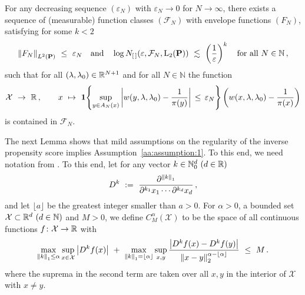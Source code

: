 \begin{assumption}
  \label{aa:assumption:1}
  For any decreasing sequence
  $(\varepsilon_N)$ with $\varepsilon_N\to 0$ for $N\to\infty$,
there exists a sequence of (measurable) function classes
$(\mathcal{F}_N)$
with envelope functions
$(F_N)$,
satisfying 
for some $k<2$
\begin{gather*}
\norm{F_N}_{L^2(\P)}
\ 
\le
\ 
\varepsilon_N
\quad
\text{and}
\quad
  \log
  N_{[\,]}(\varepsilon,\mathcal{F}_N,\mathrm{L}_2(\P))
  \ 
  \lesssim
  \ 
  \left( 
  \frac{1}{\varepsilon}
  \right)^k
  \quad
  \text{for all}
  \ 
  N\in\mathbb{N}
  \,,
\end{gather*}
such that for all $(\lambda,\lambda_0)\in\mathbb{R}^{N+1}$ and for all $N\in\mathbb{N}$ the function
\begin{gather}
  \label{ghost_function}
  \mathcal{X}
  \ 
  \to
  \ 
  \R
  \,,
  \qquad
  x
  \ 
  \mapsto
  \ 
  \mathbf{1}{
    \left\{ 
      \sup_{y\in A_N(x)}
      \left| 
      w(y,\lambda,\lambda_0)
      -
      \frac{1}{\pi(y)}
      \right|
      \,
      \le
      \,
      \varepsilon_N
    \right\}
  }
  \left( 
      w(x,\lambda,\lambda_0)
      -
      \frac{1}{\pi(x)}
  \right)
\end{gather}
is contained in $\mathcal{F}_N$.
\end{assumption}
The next Lemma shows that mild assumptions on the regularity of the inverse propensity score implies Assumption~\ref{aa:assumption:1}.
To this end, we need notation from \cite[§2.7.1]{vaart2013}.
To this end, let for any vector $k\in\mathbb{N}_0^d \ (d\in\mathbb{R})$
\begin{gather*}
  D^k
  \ :=\ 
  \frac
  {\partial^{\norm{k}_1}}
  {
    \partial^{k_1}x_1
    \cdots
    \partial^{k_d}x_d
  }
  \,,
\end{gather*}
and let $\lfloor a \rfloor$ be the greatest integer smaller than $a>0$.
For $\alpha>0$, a bounded set 
$\mathcal{X}\subset\R^d\ (d\in\mathbb{N})$
and
$M>0$, we define $C^\alpha_M(\mathcal{X})$ to be the space of all continuous functions $f\colon \mathcal{X}\to\mathbb{R}$ with
\begin{gather*}
  \max_{\norm{k}_1\le \alpha}\sup_{x\in\mathcal{X}}
  \left| D^k f(x) \right|
  \ 
  +
  \ 
  \max_{\norm{k}_1=\lfloor \alpha \rfloor}\sup_{x,y}
  \frac
  {
  \left|
  D^k f(x) 
  -
  D^k f(y) 
  \right|
  }
  {
    \norm{x-y}_2^{\alpha-\lfloor \alpha \rfloor}
  }
  \
  \le
  \ 
  M
  \,.
\end{gather*}
where the suprema in the second term are taken over all $x,y$ in the interior of $\mathcal{X}$ with $x\neq y$.
